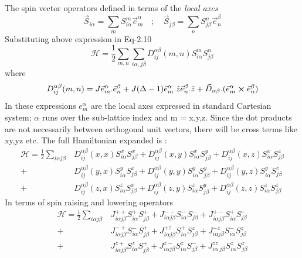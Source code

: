 \noindent The spin vector operators defined in terms of the \textit{local axes}
\begin{equation}
\vec{S}_{i\alpha} = \sum_{m}^{}S^m_{i\alpha}\vec{e}^\alpha_m \quad;\quad \vec{S}_{j\beta} = \sum_{n}^{}S^n_{j\beta}\vec{e}^\beta_n
\end{equation}
Substituting above expression in Eq-2.10
\begin{equation}\label{eq31}
\mathcal{H} = \frac{1}{2}\sum_{m,n}^{}\sum_{i\alpha,j\beta}^{}D^{\alpha \beta}_{ij}(m,n)S^m_{i\alpha}S^n_{j\beta}
\end{equation}
where
\begin{equation}
    D^{\alpha \beta}_{ij}(m,n) = J\vec{e}^\alpha_m.\vec{e}^\beta_n + J(\Delta - 1)\vec{e}^\alpha_m.\hat{z}\vec{e}^\beta_n.\hat{z}   + \vec{D}_{\alpha \beta}.(\vec{e}^\alpha_m \cross \vec{e}^\beta_n)
\end{equation}
In these expressions $ e^\alpha_{m} $ are the local axes expressed in standard Cartesian system; $ \alpha $ runs over the sub-lattice index and m = x,y,z. Since the dot products are not necessarily between orthogonal unit vectors, there will be cross terms like xy,yz etc. The full Hamiltonian expanded is :
\begin{equation}
\begin{split}
\mathcal{H} = \frac{1}{2} \sum_{i\alpha j\beta}^{}  &D^{\alpha \beta}_{ij}(x,x)S^x_{i\alpha}S^x_{j\beta} + D^{\alpha \beta}_{ij}(x,y)S^x_{i\alpha}S^y_{j\beta} + D^{\alpha \beta}_{ij}(x,z)S^x_{i\alpha}S^z_{j\beta}\\ + &D^{\alpha \beta}_{ij}(y,x)S^y_{i\alpha}S^x_{j\beta} + D^{\alpha \beta}_{ij}(y,y)S^y_{i\alpha}S^y_{j\beta} + D^{\alpha \beta}_{ij}(y,z)S^y_{i\alpha}S^z_{j\beta}\\ + &D^{\alpha \beta}_{ij}(z,x)S^z_{i\alpha}S^x_{j\beta} + D^{\alpha \beta}_{ij}(z,y)S^z_{i\alpha}S^y_{j\beta} + D^{\alpha \beta}_{ij}(z,z)S^z_{i\alpha}S^z_{j\beta}  
\end{split}			
\end{equation} 
In terms of spin raising and lowering operators
\begin{equation}
\begin{split}
\mathcal{H} = \frac{1}{2}\sum_{i\alpha j\beta}^{}&J^{++}_{i\alpha j\beta}S^{+}_{i\alpha}S^{+}_{j\beta} + J^{--}_{i\alpha j\beta}S^{-}_{i\alpha}S^{-}_{j\beta} + J^{+-}_{i\alpha j\beta}S^{+}_{i\alpha}S^{-}_{j\beta}\\ + &J^{-+}_{i\alpha j\beta}S^{-}_{i\alpha}S^{+}_{j\beta} + J^{+z}_{i\alpha j\beta}S^{+}_{i\alpha}S^{z}_{j\beta} + J^{-z}_{i\alpha j\beta}S^{-}_{i\alpha}S^{z}_{j\beta}\\ + &J^{z+}_{i\alpha 
	j\beta}S^{z}_{i\alpha}S^{+}_{j\beta} + J^{z-}_{i\alpha
	j\beta}S^{z}_{i\alpha}S^{-}_{j\beta} + J^{zz}_{i\alpha\
	j\beta}S^{z}_{i\alpha}S^{z}_{j\beta}			
\end{split}
\end{equation}
